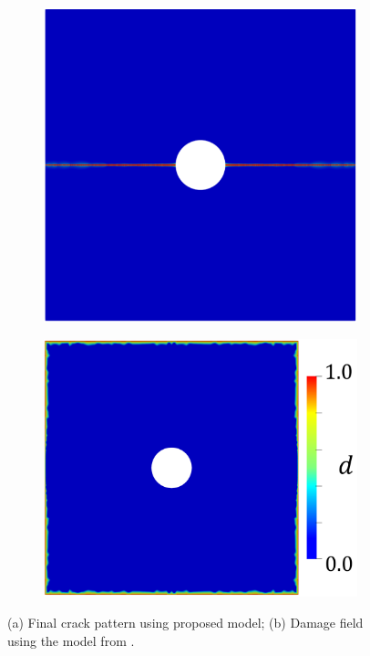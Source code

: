 \begin{figure}[h]
\begin{subfigure}{.49\textwidth}
  \centering
  \includegraphics[width=0.7\linewidth]{images/2d_nucleation/gary_crack.png}
  \caption{}
  \label{fig:damage_profile_gary}
\end{subfigure}%
\begin{subfigure}{.49\textwidth}
  \centering
  \includegraphics[width=0.86\linewidth]{images/2d_nucleation/bourdin_crack.png}
  \caption{}
  \label{fig:damage_profile_bourdin}
\end{subfigure}%
  \caption{(a) Final crack pattern using proposed model; (b) Damage field using the model from \cite{bourdin2012variational}. } 
  \label{fig:damage_profiles}
\end{figure}

